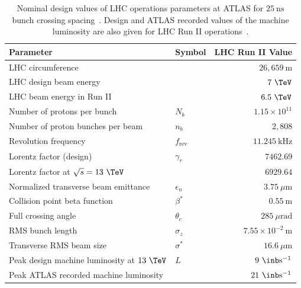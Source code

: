 \begin{table}[htpb]
 \centering
 \caption{
  Nominal design values of LHC operations parameters at ATLAS for $25~\textrm{ns}$ bunch crossing spacing~\cite{Evans:2008zzb,PhysRevAccelBeams.19.101003}.
  Design and ATLAS recorded values of the machine luminosity are also given for LHC Run II operations~\cite{TWiki:2018ATLASPeakLumi}.
 }
 \begin{tabular}{@{}llr@{}} \toprule
  Parameter                                   & Symbol             & LHC Run II Value                \\ \midrule
  LHC circumference                           &                    & $26,659~\mathrm{m}$             \\
  LHC design beam energy                      &                    & $7~\TeV$                        \\
  LHC beam energy in Run II                   &                    & $6.5~\TeV$                      \\
  Number of protons per bunch                 & $N_{b}$            & $1.15 \times 10^{11}$           \\
  Number of proton bunches per beam           & $n_{b}$            & $2,808$                         \\
  Revolution frequency                        & $f_{\textrm{rev}}$ & $11.245~\mathrm{kHz}$           \\
  Lorentz factor (design)                     & $\gamma_{r}$       & $7462.69$                       \\
  Lorentz factor at $\sqrt{s} = 13~\TeV$      &                    & $6929.64$                       \\
  Normalized transverse beam emittance        & $\epsilon_{n}$     & $3.75~\mu\mathrm{m}$            \\
  Collision point beta function               & $\beta^{*}$        & $0.55~\mathrm{m}$               \\
  Full crossing angle                         & $\theta_{c}$       & $285~\mu\mathrm{rad}$           \\
  RMS bunch length                            & $\sigma_{z}$       & $7.55\times 10^{-2}~\mathrm{m}$ \\
  Transverse RMS beam size                    & $\sigma^{*}$       & $16.6~\mu\mathrm{m}$            \\ \midrule
  Peak design machine luminosity at $13~\TeV$ & $L$                & $9~\inb\mathrm{s}^{-1}$         \\
  Peak ATLAS recorded machine luminosity      &                    & $21~\inb\mathrm{s}^{-1}$        \\
  \bottomrule
 \end{tabular}\label{table:nominal_values}
\end{table}

